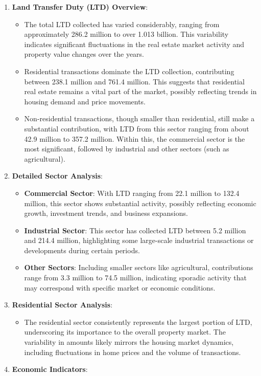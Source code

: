 \documentclass[11pt,a4paper,]{article}
\providecommand{\tightlist}{%
  \setlength{\itemsep}{0pt}\setlength{\parskip}{0pt}}
\begin{document}
\begin{enumerate}
\def\labelenumi{\arabic{enumi}.}
\tightlist
\item
  \textbf{Land Transfer Duty (LTD) Overview}:

  \begin{itemize}
  \tightlist
  \item
    The total LTD collected has varied considerably, ranging from approximately 286.2 million to over 1.013 billion. This variability indicates significant fluctuations in the real estate market activity and property value changes over the years.
  \item
    Residential transactions dominate the LTD collection, contributing between 238.1 million and 761.4 million. This suggests that residential real estate remains a vital part of the market, possibly reflecting trends in housing demand and price movements.
  \item
    Non-residential transactions, though smaller than residential, still make a substantial contribution, with LTD from this sector ranging from about 42.9 million to 357.2 million. Within this, the commercial sector is the most significant, followed by industrial and other sectors (such as agricultural).
  \end{itemize}
\item
  \textbf{Detailed Sector Analysis}:

  \begin{itemize}
  \tightlist
  \item
    \textbf{Commercial Sector}: With LTD ranging from 22.1 million to 132.4 million, this sector shows substantial activity, possibly reflecting economic growth, investment trends, and business expansions.
  \item
    \textbf{Industrial Sector}: This sector has collected LTD between 5.2 million and 214.4 million, highlighting some large-scale industrial transactions or developments during certain periods.
  \item
    \textbf{Other Sectors}: Including smaller sectors like agricultural, contributions range from 3.3 million to 74.5 million, indicating sporadic activity that may correspond with specific market or economic conditions.
  \end{itemize}
\item
  \textbf{Residential Sector Analysis}:

  \begin{itemize}
  \tightlist
  \item
    The residential sector consistently represents the largest portion of LTD, underscoring its importance to the overall property market. The variability in amounts likely mirrors the housing market dynamics, including fluctuations in home prices and the volume of transactions.
  \end{itemize}
\item
  \textbf{Economic Indicators}:


\end{enumerate}
\end{document}
